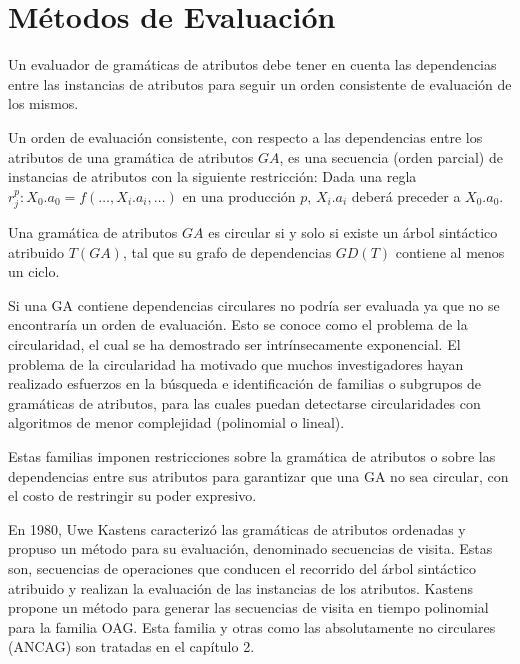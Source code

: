 \section{Métodos de Evaluación}
\label{sec:met_eval}
Un evaluador de gramáticas de atributos debe tener en cuenta las dependencias entre las instancias de atributos para seguir un orden consistente de evaluación de los mismos.
\begin{definition} Un orden de evaluación consistente, con respecto a las dependencias entre los atributos de una gramática de atributos $GA$, es una secuencia (orden parcial) de instancias de atributos con la siguiente restricción:
Dada una regla $r_{j}^{p} : X_{0}.a_{0} = f(\ldots, X_{i}.a_{i}, \ldots)$ en una producción $p$, 
$X_{i}.a_{i}$ deberá preceder a $X_{0}.a_{0}$.
\end{definition}

\begin{definition} 
Una gramática de atributos $GA$ es circular si y solo si existe un árbol sintáctico atribuido $T(GA)$, tal que su grafo de dependencias $GD(T)$ contiene al menos un ciclo.
\end{definition}

Si una GA contiene dependencias circulares no podría ser evaluada ya que no se encontraría un orden de evaluación. Esto se conoce como el problema de la circularidad, el cual se ha demostrado ser intrínsecamente exponencial\cite{intri-exc}. El problema de la circularidad ha motivado que muchos investigadores hayan realizado esfuerzos en la búsqueda e identificación de familias o subgrupos de gramáticas de atributos, para las cuales puedan detectarse circularidades con algoritmos de menor complejidad (polinomial o lineal).

Estas familias imponen restricciones sobre la gramática de atributos o sobre las dependencias entre sus atributos para garantizar que una GA no sea circular, con el costo de restringir su poder expresivo.

En 1980, Uwe Kastens\cite{kastens} caracterizó las gramáticas de atributos ordenadas y propuso un método para su evaluación, denominado secuencias de visita. Estas son, secuencias de operaciones que conducen el recorrido del árbol sintáctico atribuido y realizan la evaluación de las instancias de los atributos. Kastens propone un método para generar las secuencias de visita en tiempo polinomial para la familia OAG. Esta familia y otras como las absolutamente no circulares (ANCAG) son tratadas en el capítulo 2.

